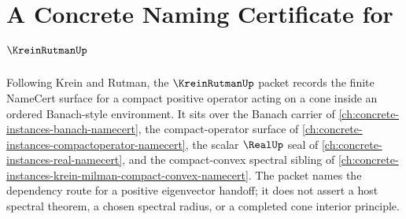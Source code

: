 \chapter{A Concrete Naming Certificate for $\KreinRutmanUp$}
\label{ch:concrete-instances-krein-rutman-namecert}

Following Krein and Rutman, the $\KreinRutmanUp$ packet records the finite NameCert surface for a compact positive operator acting on a cone inside an ordered Banach-style environment. It sits over the Banach carrier of \autoref{ch:concrete-instances-banach-namecert}, the compact-operator surface of \autoref{ch:concrete-instances-compactoperator-namecert}, the scalar $\RealUp$ seal of \autoref{ch:concrete-instances-real-namecert}, and the compact-convex spectral sibling of \autoref{ch:concrete-instances-krein-milman-compact-convex-namecert}. The packet names the dependency route for a positive eigenvector handoff; it does not assert a host spectral theorem, a chosen spectral radius, or a completed cone interior principle.

